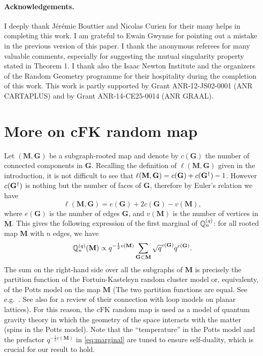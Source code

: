 \documentclass[a4paper]{article}
\newcommand*{\map}{\mathbf}
\begin{document}
\paragraph{Acknowledgements.}
I deeply thank Jérémie Bouttier and Nicolas Curien for their many helps in completing this work.
I am grateful to Ewain Gwynne for pointing out a mistake in the previous version of this paper.
I thank the anonymous referees for many valuable comments, especially for suggesting the mutual singularity property stated in Theorem 1.
I thank also the Isaac Newton Institute and the organizers of the Random Geometry programme for their hospitality during the completion of this work.
This work is partly supported by Grant ANR-12-JS02-0001 (ANR CARTAPLUS) and by Grant ANR-14-CE25-0014 (ANR GRAAL).

\section{More on cFK random map} \label{sec:cFK}
Let $( \mathbf{M}, \mathbf{G})$ be a subgraph-rooted map and denote by $c(\map{G})$ the number of connected components in $\map{G}$.
Recalling the definition of $\ell( \mathbf{M}, \mathbf{G})$ given in the introduction, it is not difficult to see that $\ell( \mathbf{M}, \mathbf{G})=c(\map{G})+c(\map{G}^\dual)-1$.
However $c(\map{G}^\dual)$ is nothing but the number of faces of $\map{G}$, therefore by Euler's relation we have
\begin{equation}\label{eq:loop number}
	\ell(\map{M,G}) = e(\map{G}) + 2c(\map{G}) - v(\map{M}),
\end{equation}
where $e(\map{G})$ is the number of edges $\map{G}$, and $v(\map{M})$ is the number of vertices in $\map{M}$.
This gives the following expression of the first marginal of $\proba[Q]\ind{q}_n$:
for all rooted map $\map{M}$ with $n$ edges, we have
\begin{equation}\label{eq:marginal}
	\proba[Q]\ind{q}_n(\map{M}) \propto q^{-\frac{1}{2} v(\map{M})}
		\sum_{\map{G\subset M}} \sqrt{q}^{e(\map{G})} q^{ c(\map{G})}.
\end{equation}
The sum on the right-hand side over all the subgraphs of $\map{M}$ is
precisely the partition function of the Fortuin-Kasteleyn random
cluster model or, equivalenty, of the Potts model on the map
$\map{M}$
(The two partition functions are equal. See e.g.~\cite[Section 1.4]{Gri06}.
See also \cite[Section 2.1]{BBG12c} for a review of their connection with loop models on planar lattices).
For this reason, the cFK random map is used as a model of quantum gravity theory in which the geometry of the space interacts with the matter (spins in the Potts model).
Note that the ``temperature'' in the Potts model and the prefactor $q^{-\frac{1}{2}v(\map{M})}$ in \eqref{eq:marginal} are tuned to ensure self-duality, which is crucial for our result to hold.
\end{document}
